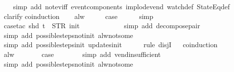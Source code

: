 \begin{isabellebody}
%
\isadelimproof
\ \ %
\endisadelimproof
%
\isatagproof
{}\isamarkupfalse%
\ {\isacharparenleft}simp\ add{\isacharcolon}\ not{\isacharunderscore}ev{\isacharunderscore}iff\ event{\isacharunderscore}components\ implode{\isacharunderscore}vend\ watch{\isacharunderscore}def\ StateEq{\isacharunderscore}def{\isacharparenright}\isanewline
\ \ \isamarkupfalse%
\ clarify\isanewline
{}\isamarkupfalse%
{\isacharparenleft}coinduction{\isacharparenright}\isanewline
\ \ \isamarkupfalse%
\ alw\isanewline
\ \ \isamarkupfalse%
\ \isamarkupfalse%
\ {\isacharquery}case\isanewline
\ \ \ \ \isamarkupfalse%
\ simp\isanewline
\ \ \ \ \isamarkupfalse%
\ {\isacharparenleft}case{\isacharunderscore}tac\ {\isachardoublequoteopen}shd\ t\ {\isacharequal}\ {\isacharparenleft}STR\ {\isacharprime}{\isacharprime}init{\isacharprime}{\isacharprime}{\isacharcomma}\ {\isacharbrackleft}{\isacharbrackright}{\isacharparenright}{\isachardoublequoteclose}{\isacharparenright}\isanewline
\ \ \ \ \ \isamarkupfalse%
\isanewline
\ \ \ \ \isamarkupfalse%
\ {\isacharparenleft}simp\ add{\isacharcolon}\ decompose{\isacharunderscore}pair{\isacharparenright}\isanewline
\ \ \ \ \ \isamarkupfalse%
\ {\isacharparenleft}simp\ add{\isacharcolon}\ possible{\isacharunderscore}steps{\isacharunderscore}not{\isacharunderscore}init\ alw{\isacharunderscore}not{\isacharunderscore}some{\isacharparenright}\isanewline
\ \ \ \ \isamarkupfalse%
\ {\isacharparenleft}simp\ add{\isacharcolon}\ possible{\isacharunderscore}steps{\isacharunderscore}init\ updates{\isacharunderscore}init{\isacharparenright}\isanewline
\ \ \ \ \isamarkupfalse%
\ {\isacharparenleft}rule\ disjI{}{\isacharparenright}\isanewline
\ \ \isamarkupfalse%
{\isacharparenleft}coinduction{\isacharparenright}\isanewline
\ \ \ \ \isamarkupfalse%
\ alw\isanewline
\ \ \ \ \isamarkupfalse%
\ \isamarkupfalse%
\ {\isacharquery}case\isanewline
\ \ \ \ \ \ \isamarkupfalse%
\ {\isacharparenleft}simp\ add{\isacharcolon}\ vend{\isacharunderscore}insufficient{\isacharparenright}\isanewline
\ \ \ \ \ \isamarkupfalse%
\ {\isacharparenleft}simp\ add{\isacharcolon}\ possible{\isacharunderscore}steps{\isacharunderscore}not{\isacharunderscore}init\ alw{\isacharunderscore}not{\isacharunderscore}some{\isacharparenright}\isanewline
\ \ \isamarkupfalse%

\end{isabellebody}

